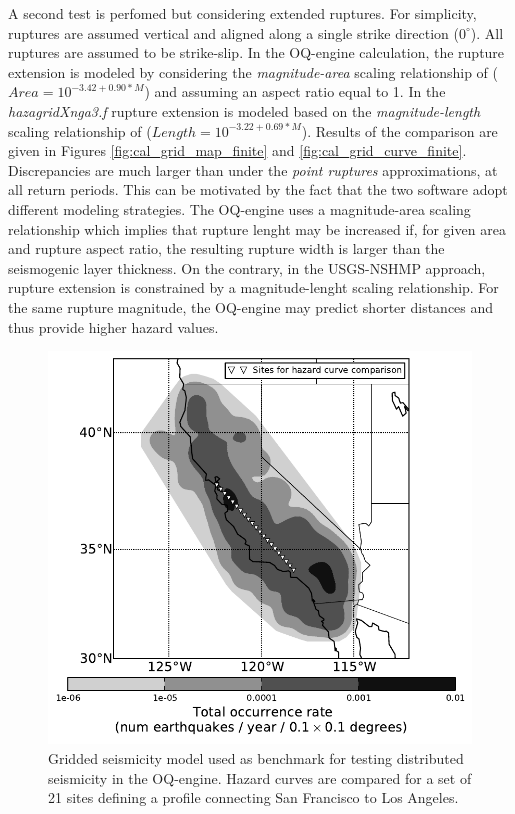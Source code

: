 A second test is perfomed but considering extended ruptures. For simplicity, ruptures are assumed vertical and aligned along a single strike direction ($0^{\circ}$). All ruptures are assumed to be strike-slip. In the OQ-engine calculation, the rupture extension is modeled by considering the \textit{magnitude-area} scaling relationship of \cite{wells1994} ($Area = 10^{-3.42 + 0.90 * M}$) and assuming an aspect ratio equal to 1. In the \textit{hazagridXnga3.f} rupture extension is modeled based on the \textit{magnitude-length} scaling relationship of \cite{wells1994} ($Length = 10^{-3.22+0.69 * M}$). Results of the comparison are given in Figures \ref{fig:cal_grid_map_finite} and \ref{fig:cal_grid_curve_finite}. Discrepancies are much larger than under the \textit{point ruptures} approximations, at all return periods. This can be motivated by the fact that
the two software adopt different modeling strategies. The OQ-engine uses a magnitude-area scaling relationship which implies that rupture lenght may be increased if, for given area and rupture aspect ratio, the resulting rupture width is larger than the seismogenic layer thickness. On the contrary, in the USGS-NSHMP approach, rupture extension is constrained by a magnitude-lenght scaling relationship. For the same rupture magnitude, the OQ-engine may predict shorter distances and thus provide higher hazard values.

\begin{figure}
\centering
\includegraphics[width=12cm]{./qareport/pictures/CAmapC_21.pdf}
\caption{Gridded seismicity model used as benchmark for testing distributed seismicity in the OQ-engine. Hazard curves are compared for a set of 21 sites defining a profile connecting San Francisco to Los Angeles.}
\label{fig:cal_grid}
\end{figure}


